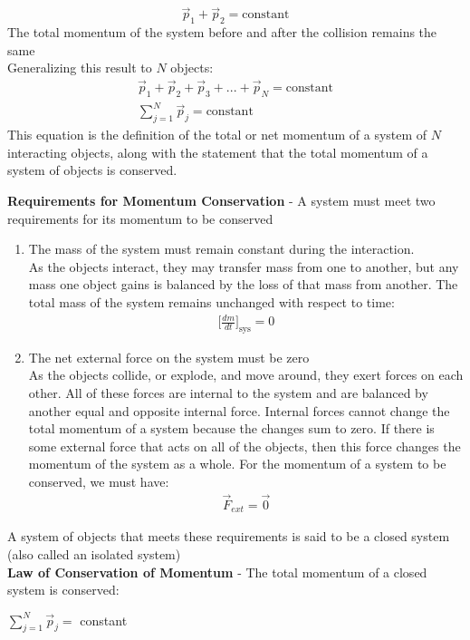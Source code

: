 \documentclass[a4paper]{article}
\let\bf\textbf
\begin{document}
\begin{equation}
    \vec{p}_1 + \vec{p}_2 = \text{constant}
\end{equation}
The total momentum of the system before and after the collision remains the same
\vspace{1mm}\\
Generalizing this result to $N$ objects:
\begin{equation}
    \begin{aligned}
        \vec{p}_1 + \vec{p}_2 + \vec{p}_3 + ... + \vec{p}_N = \text{constant}\\
        \sum_{j=1}^{N}\vec{p}_j = \text{constant}
    \end{aligned}
\end{equation}
This equation is the definition of the total or net momentum of a system of $N$ interacting objects, along with the statement that the total momentum of a system of objects is conserved.

\newpage
\noindent\bf{Requirements for Momentum Conservation} - A system must meet two requirements for its momentum to be conserved
\begin{enumerate}
    \item The mass of the system must remain constant during the interaction.\\
    As the objects interact, they may transfer mass from one to another, but any mass one object gains is balanced by the loss of that mass from another. The total mass of the system remains unchanged with respect to time:
    \begin{align*}
        \displaystyle \bigg[\frac{dm}{dt}\bigg]_{\text{sys}} = 0
    \end{align*}
    \item The net external force on the system must be zero\\
    As the objects collide, or explode, and move around, they exert forces on each other. All of these forces are internal to the system and are balanced by another equal and opposite internal force. Internal forces cannot change the total momentum of a system because the changes sum to zero. If there is some external force that acts on all of the objects, then this force changes the momentum of the system as a whole. For the momentum of a system to be conserved, we must have:
    \begin{align*}
        \displaystyle \vec{F}_{ext} = \vec{0}
    \end{align*}
\end{enumerate}
A system of objects that meets these requirements is said to be a closed system (also called an isolated system)
\vspace{2mm}\\
\bf{Law of Conservation of Momentum} - The total momentum of a closed system is conserved:
\begin{center}
    $\displaystyle \sum_{j=1}^{N}\vec{p}_j =$ constant
\end{center}
\vspace{2mm}
\end{document}
